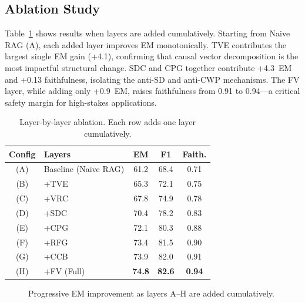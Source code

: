 \documentclass[10pt,twocolumn]{article}
\begin{document}
\subsection{Ablation Study}

Table~\ref{tab:ablation} shows results when layers are added cumulatively.
Starting from Naive RAG (A), each added layer improves EM monotonically.
TVE contributes the largest single EM gain (+4.1), confirming that causal
vector decomposition is the most impactful structural change.  SDC and CPG
together contribute +4.3~EM and +0.13 faithfulness, isolating the anti-SD
and anti-CWP mechanisms.  The FV layer, while adding only +0.9~EM, raises
faithfulness from 0.91 to 0.94---a critical safety margin for high-stakes
applications.

\begin{table}[h]
\centering
\caption{Layer-by-layer ablation.  Each row adds one layer cumulatively.}
\label{tab:ablation}
\footnotesize
\setlength{\tabcolsep}{4pt}
\begin{tabular}{@{}clccc@{}}
\toprule
\textbf{Config} & \textbf{Layers} & \textbf{EM} & \textbf{F1} & \textbf{Faith.} \\
\midrule
(A) & Baseline (Naive RAG)  & 61.2 & 68.4 & 0.71 \\
(B) & +TVE                  & 65.3 & 72.1 & 0.75 \\
(C) & +VRC                  & 67.8 & 74.9 & 0.78 \\
(D) & +SDC                  & 70.4 & 78.2 & 0.83 \\
(E) & +CPG                  & 72.1 & 80.3 & 0.88 \\
(F) & +RFG                  & 73.4 & 81.5 & 0.90 \\
(G) & +CCB                  & 73.9 & 82.0 & 0.91 \\
(H) & +FV (Full)            & \textbf{74.8} & \textbf{82.6} & \textbf{0.94} \\
\bottomrule
\end{tabular}
\end{table}

\begin{figure}[h]
\centering
{}
\caption{Progressive EM improvement as layers A--H are added cumulatively.}
\label{fig:ablation_bar}
\end{figure}
\end{document}
